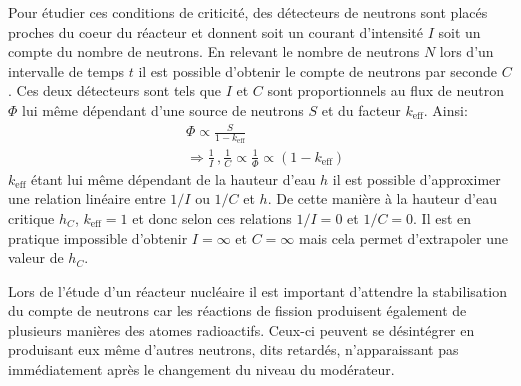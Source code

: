Pour étudier ces conditions de criticité, des détecteurs de neutrons sont placés proches du coeur du réacteur et donnent soit un courant d'intensité $I$ soit un compte du nombre de neutrons. En relevant le nombre de neutrons $N$ lors d'un intervalle de temps $t$ il est possible d'obtenir le compte de neutrons par seconde $C$. Ces deux détecteurs sont tels que $I$ et $C$ sont proportionnels au flux de neutron $\Phi$ lui même dépendant d'une source de neutrons $S$ et du facteur $k_\mathrm{eff}$. Ainsi:
\begin{equation}
    \begin{aligned}
        & \Phi \propto \frac{S}{1 - k_\mathrm{eff}} \\
        & \Rightarrow \frac{1}{I} \, , \frac{1}{C} \propto \frac{1}{\Phi} \propto (1 - k_\mathrm{eff})
    \end{aligned}
    \label{eq:proportionalities}
\end{equation}
$k_\mathrm{eff}$ étant lui même dépendant de la hauteur d'eau $h$ il est possible d'approximer une relation linéaire entre $1/I$ ou $1/C$ et $h$. De cette manière à la hauteur d'eau critique $h_C$, $k_\mathrm{eff}=1$ et donc selon ces relations $1/I = 0$ et $1/C = 0$. Il est en pratique impossible d'obtenir $I = \infty$ et $C = \infty$ mais cela permet d'extrapoler une valeur de $h_C$.

Lors de l'étude d'un réacteur nucléaire il est important d'attendre la stabilisation du compte de neutrons car les réactions de fission produisent également de plusieurs manières des atomes radioactifs. Ceux-ci peuvent se désintégrer en produisant eux même d'autres neutrons, dits retardés, n'apparaissant pas immédiatement après le changement du niveau du modérateur.